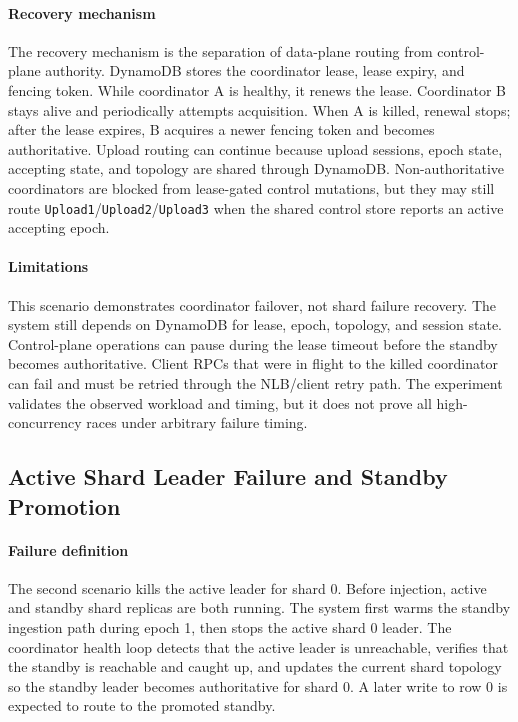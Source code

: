 \documentclass[conference]{IEEEtran}
\begin{document}
\paragraph{Recovery mechanism}
The recovery mechanism is the separation of data-plane routing from control-plane authority. DynamoDB stores the coordinator lease, lease expiry, and fencing token. While coordinator A is healthy, it renews the lease. Coordinator B stays alive and periodically attempts acquisition. When A is killed, renewal stops; after the lease expires, B acquires a newer fencing token and becomes authoritative. Upload routing can continue because upload sessions, epoch state, accepting state, and topology are shared through DynamoDB. Non-authoritative coordinators are blocked from lease-gated control mutations, but they may still route \texttt{Upload1}/\texttt{Upload2}/\texttt{Upload3} when the shared control store reports an active accepting epoch.

\paragraph{Limitations}
This scenario demonstrates coordinator failover, not shard failure recovery. The system still depends on DynamoDB for lease, epoch, topology, and session state. Control-plane operations can pause during the lease timeout before the standby becomes authoritative. Client RPCs that were in flight to the killed coordinator can fail and must be retried through the NLB/client retry path. The experiment validates the observed workload and timing, but it does not prove all high-concurrency races under arbitrary failure timing.

\subsection{Active Shard Leader Failure and Standby Promotion}

\paragraph{Failure definition}
The second scenario kills the active leader for shard 0. Before injection, active and standby shard replicas are both running. The system first warms the standby ingestion path during epoch 1, then stops the active shard 0 leader. The coordinator health loop detects that the active leader is unreachable, verifies that the standby is reachable and caught up, and updates the current shard topology so the standby leader becomes authoritative for shard 0. A later write to row 0 is expected to route to the promoted standby.
\end{document}
